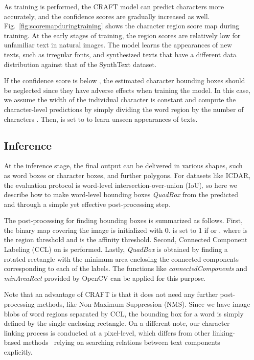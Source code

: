 \documentclass[10pt,twocolumn,letterpaper]{article}
\begin{document}
As training is performed, the CRAFT model can predict characters more accurately, and the confidence scores  are gradually increased as well. 
Fig.~\ref{fig:scoremapduringtraining} shows the character region score map during training. At the early stages of training, the region scores are relatively low for unfamiliar text in natural images. The model learns the appearances of new texts, such as irregular fonts, and synthesized texts that have a different data distribution against that of the SynthText dataset. 


If the confidence score  is below , the estimated character bounding boxes should be neglected since they have adverse effects when training the model. In this case, we assume the width of the individual character is constant and compute the character-level predictions by simply dividing the word region  by the number of characters . Then,  is set to  to learn unseen appearances of texts.





\subsection{Inference}
At the inference stage, the final output can be delivered in various shapes, such as word boxes or character boxes, and further polygons.
For datasets like ICDAR, the evaluation protocol is word-level intersection-over-union (IoU), so here we describe how to make word-level bounding boxes \textit{QuadBox} from the predicted  and  through a simple yet effective post-processing step. 

The post-processing for finding bounding boxes is summarized as follows. First, the binary map  covering the image is initialized with 0.  is set to 1 if  or , where  is the region threshold and  is the affinity threshold. Second, Connected Component Labeling (CCL) on  is performed. Lastly, \textit{QuadBox} is obtained by finding a rotated rectangle with the minimum area enclosing the connected components corresponding to each of the labels. The functions like \textit{connectedComponents} and \textit{minAreaRect} provided by OpenCV can be applied for this purpose.





Note that an advantage of CRAFT is that it does not need any further post-processing methods, like Non-Maximum Suppression (NMS). Since we have image blobs of word regions separated by CCL, the bounding box for a word is simply defined by the single enclosing rectangle. On a different note, our character linking process is conducted at a pixel-level, which differs from other linking-based methods~\cite{shi2017detecting,hu2017wordsup} relying on searching relations between text components explicitly.
\end{document}
